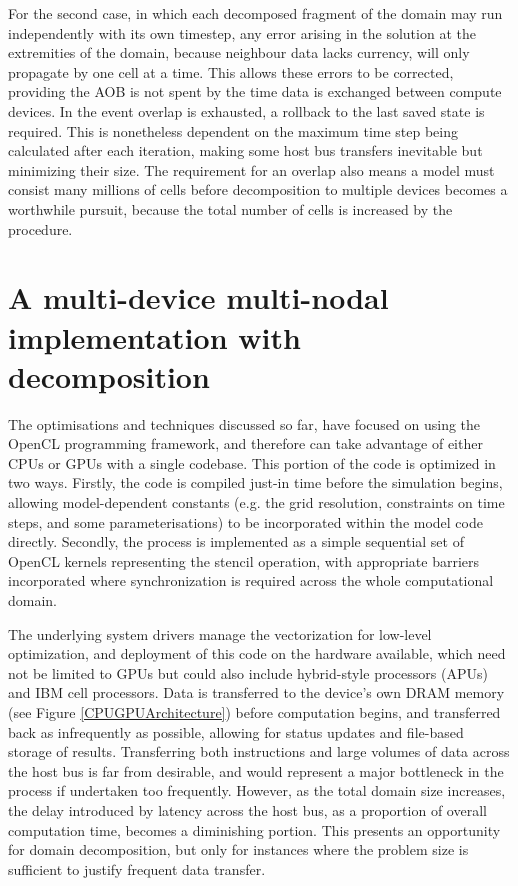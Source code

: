 For the second case, in which each decomposed fragment of the domain may run independently with its own timestep, any error arising in the solution at the extremities of the domain, because neighbour data lacks currency, will only propagate by one cell at a time. This allows these errors to be corrected, providing the AOB is not spent by the time data is exchanged between compute devices. In the event overlap is exhausted, a rollback to the last saved state is required. This is nonetheless dependent on the maximum time step being calculated after each iteration, making some host bus transfers inevitable but minimizing their size. The requirement for an overlap also means a model must consist many millions of cells before decomposition to multiple devices becomes a worthwhile pursuit, because the total number of cells is increased by the procedure.

\section{A multi-device multi-nodal implementation with decomposition}

The optimisations and techniques discussed so far, have focused on using the OpenCL programming framework, and therefore can take advantage of either CPUs or GPUs with a single codebase. This portion of the code is optimized in two ways. Firstly, the code is compiled just-in time before the simulation begins, allowing model-dependent constants (e.g. the grid resolution, constraints on time steps, and some parameterisations) to be incorporated within the model code directly. Secondly, the process is implemented as a simple sequential set of OpenCL kernels representing the stencil operation, with appropriate barriers incorporated where synchronization is required across the whole computational domain.

The underlying system drivers manage the vectorization for low-level optimization, and deployment of this code on the hardware available, which need not be limited to GPUs but could also include hybrid-style processors (APUs) and IBM cell processors. Data is transferred to the device's own DRAM memory (see Figure \ref{CPUGPUArchitecture}) before computation begins, and transferred back as infrequently as possible, allowing for status updates and file-based storage of results. Transferring both instructions and large volumes of data across the host bus is far from desirable, and would represent a major bottleneck in the process if undertaken too frequently. However, as the total domain size increases, the delay introduced by latency across the host bus, as a proportion of overall computation time, becomes a diminishing portion. This presents an opportunity for domain decomposition, but only for instances where the problem size is sufficient to justify frequent data transfer.

